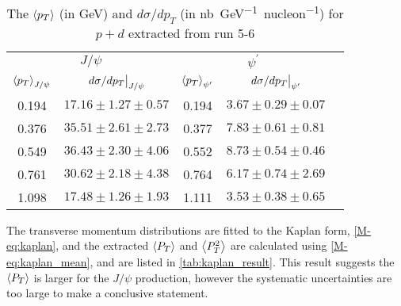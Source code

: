 \documentclass[../main.tex]{subfiles}
\begin{document}
\begin{table}[h!]
	\centering
	\caption{The $\expval{p_T}$ (in \unit{\GeV}) and  $d\sigma/dp_T$ (in \unit{\nano\barn\GeV^{-1} nucleon^{-1}}) for $p+d$ extracted from run 5-6}
	\begin{tabular}{cc|ccc}
		\hline
		\multicolumn{2}{c|}{$J/\psi$} & \multicolumn{2}{c}{$\psi^{\prime}$} &                                                                      \\ \cline{1-4}
		$\expval{p_T}_{J/\psi} $       & $\eval{d\sigma/dp_T}_{J/\psi}$      & $\expval{p_T}_{\psi^\prime}$ & $\eval{d\sigma/dp_T}_{\psi^\prime}$ & \\ \cline{1-4}
		\multicolumn{1}{c|}{0.194}    & $17.16\pm1.27\pm0.57$               & \multicolumn{1}{c|}{0.194}   & $3.67\pm0.29\pm0.07$                & \\
		\multicolumn{1}{c|}{0.376}    & $35.51\pm2.61\pm2.73$               & \multicolumn{1}{c|}{0.377}   & $7.83\pm0.61\pm0.81$                & \\
		\multicolumn{1}{c|}{0.549}    & $36.43\pm2.30\pm4.06$               & \multicolumn{1}{c|}{0.552}   & $8.73\pm0.54\pm0.46$                & \\
		\multicolumn{1}{c|}{0.761}    & $30.62\pm2.18\pm4.38$               & \multicolumn{1}{c|}{0.764}   & $6.17\pm0.74\pm2.69$                & \\
		\multicolumn{1}{c|}{1.098}    & $17.48\pm1.26\pm1.93$               & \multicolumn{1}{c|}{1.111}   & $3.53\pm0.38\pm0.65$                & \\ \cline{1-4}
	\end{tabular}
\end{table}

The transverse momentum distributions are fitted to the Kaplan form, \cref{M-eq:kaplan}, and the extracted
$\expval{P_T}$ and $\expval{P^2_T}$ are calculated using \cref{M-eq:kaplan_mean},
and are listed in \cref{tab:kaplan_result}. This result suggests the
$\expval{P_T}$ is larger for the $J/\psi$ production, however the systematic uncertainties are too 
large to make a conclusive statement.
\end{document}
